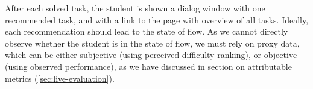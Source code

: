 After each solved task, the student is shown a dialog window with one
recommended task, and with a link to the page with overview of all tasks.
Ideally, each recommendation should lead to the state of flow.
As we cannot directly observe whether the student is in the state of flow,
we must rely on proxy data, which can be either subjective
(using perceived difficulty ranking),
or objective (using observed performance), %
as we have discussed in section
on attributable metrics (\cref{sec:live-evaluation}).

